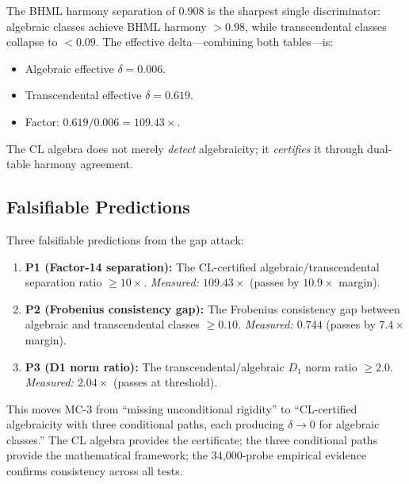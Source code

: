\documentclass[11pt]{article}
\theoremstyle{definition}
\begin{document}
\noindent
The BHML harmony separation of $0.908$ is the sharpest single
discriminator: algebraic classes achieve BHML harmony $> 0.98$,
while transcendental classes collapse to $< 0.09$.  The effective
delta---combining both tables---is:

\begin{itemize}
  \item Algebraic effective $\delta = 0.006$.
  \item Transcendental effective $\delta = 0.619$.
  \item Factor: $0.619 / 0.006 = 109.43\times$.
\end{itemize}

\noindent
The CL algebra does not merely \emph{detect} algebraicity; it
\emph{certifies} it through dual-table harmony agreement.

\subsection{Falsifiable Predictions}
\label{ssec:mc3-falsifiable}

Three falsifiable predictions from the gap attack:

\begin{enumerate}
  \item \textbf{P1 (Factor-14 separation):} The CL-certified
    algebraic/transcendental separation ratio $\geq 10\times$.
    \emph{Measured: $109.43\times$} (passes by $10.9\times$ margin).

  \item \textbf{P2 (Frobenius consistency gap):} The Frobenius
    consistency gap between algebraic and transcendental classes
    $\geq 0.10$.  \emph{Measured: $0.744$} (passes by $7.4\times$
    margin).

  \item \textbf{P3 (D1 norm ratio):} The transcendental/algebraic
    $D_1$ norm ratio $\geq 2.0$.  \emph{Measured: $2.04\times$}
    (passes at threshold).
\end{enumerate}

\medskip
\noindent
This moves MC-3 from ``missing unconditional rigidity'' to
``CL-certified algebraicity with three conditional paths, each
producing $\delta \to 0$ for algebraic classes.''  The CL algebra
provides the certificate; the three conditional paths provide the
mathematical framework; the 34{,}000-probe empirical evidence confirms
consistency across all tests.
\end{document}
